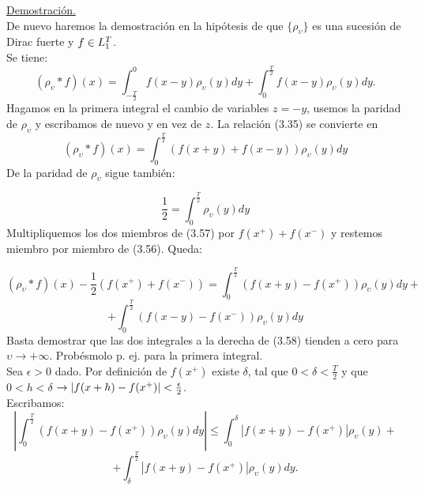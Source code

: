 \underline{Demostración.} \\
De nuevo haremos la demostración en la hipótesis de que $\lbrace \rho_\upsilon \rbrace$ es una sucesión de Dirac fuerte y $f \in L_1^T$. \\
Se tiene: 
\begin{equation}
(\rho_\upsilon * f)(x)=\int_{-\frac{T}{2}}^0 f(x-y)\rho_\upsilon (y)dy+\int_{0}^\frac{T}{2}f(x-y)\rho_\upsilon (y)dy.
\end{equation}
Hagamos en la primera integral el cambio de variables $z=-y$, usemos la paridad de $\rho_\upsilon$ y escribamos de nuevo y en vez de $z$. La relación (3.35) se convierte en
\begin{equation}
(\rho_\upsilon * f)(x)=\int_{0}^{\frac{T}{2}} (f(x+y)+f(x-y))\rho_\upsilon (y)dy
\end{equation}
De la paridad de $\rho_\upsilon$ sigue también:

\begin{equation}
\frac{1}{2}=\int_0^{\frac{T}{2}}\rho_\upsilon (y)dy
\end{equation}
Multipliquemos los dos miembros de (3.57) por $f(x^{+})+f(x^-)$ y restemos miembro por miembro de (3.56). Queda:

\begin{equation}
(\rho_\upsilon * f)(x)-\frac{1}{2} (f(x^+)+f(x^-))=\int_{0}^\frac{T}{2} (f(x+y)-f(x^+))\rho_\upsilon (y)dy+
\end{equation}
$$
+\int_{0}^\frac{T}{2} (f(x-y)-f(x^-))\rho_\upsilon (y)dy
$$
Basta demostrar que las dos integrales a la derecha de (3.58) tienden a cero para $\upsilon \to +\infty$. Probésmolo p. ej. para la primera integral. \\
Sea $\epsilon>0$ dado. Por definición de $f(x^+)$ existe $\delta$, tal que $0<\delta<\frac{T}{2}$ y que $0<h<\delta$ $\rightarrow |f(x+h)-f(x^+)|<\frac{\epsilon}{2}$.  \\
Escribamos:
\begin{equation}
|\int_0^{\frac{T}{2}}(f(x+y)-f(x^+))\rho_\upsilon (y)dy| \leq \int_0^\delta |f(x+y)-f(x^+)|\rho_\upsilon (y)+
\end{equation}
$$
+\int_{\delta}^{\frac{T}{2}}|f(x+y)-f(x^+)|\rho_\upsilon (y)dy.
$$

